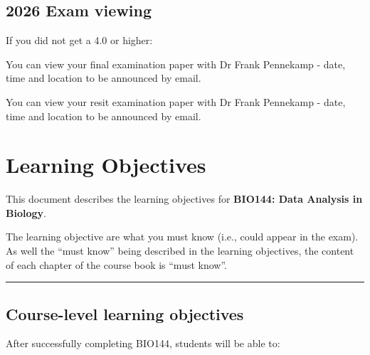 \documentclass[
  letterpaper,
  8pt,
  a4paper]{book}
\begin{document}
\section*{2026 Exam viewing}\label{exam-viewing}


If you did not get a 4.0 or higher:

You can view your final examination paper with Dr Frank Pennekamp -
date, time and location to be announced by email.

You can view your resit examination paper with Dr Frank Pennekamp -
date, time and location to be announced by email.


\chapter*{Learning Objectives}\label{learning-objectives}


This document describes the learning objectives for \textbf{BIO144: Data
Analysis in Biology}.

The learning objective are what you must know (i.e., could appear in the
exam). As well the ``must know'' being described in the learning
objectives, the content of each chapter of the course book is ``must
know''.

\begin{center}\rule{0.5\linewidth}{0.5pt}\end{center}

\section*{Course-level learning
objectives}\label{course-level-learning-objectives}


After successfully completing BIO144, students will be able to:
\end{document}
